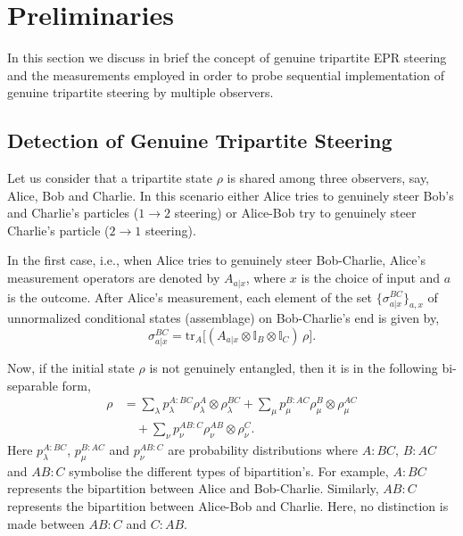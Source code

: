 \documentclass[pra,a4paper,aps,twocolumn,showpacs,superscriptaddress,groupedaddress]{revtex4}
\begin{document}
\section{Preliminaries} \label{s2}

In this section we discuss in brief the concept of genuine tripartite EPR steering and  the measurements employed in order to probe sequential implementation of genuine tripartite steering by multiple observers.

\subsection{Detection of Genuine Tripartite Steering}
 Let us consider that a tripartite state $\rho$ is shared among three observers, say, Alice, Bob and Charlie. In this scenario either Alice tries to genuinely steer Bob's and Charlie's particles ($1 \rightarrow 2$ steering) or Alice-Bob try to genuinely steer Charlie's particle ($2 \rightarrow 1$ steering).

In the first case, i.e., when Alice tries to genuinely steer Bob-Charlie,  Alice's measurement operators are denoted by $A_{a|x}$, where $x$ is the choice of input and $a$ is the outcome. After Alice's measurement, each element of the set $\{\sigma_{a|x}^{BC}\}_{a,x}$ of unnormalized conditional states (assemblage)  on Bob-Charlie's end is given by,
 \begin{equation}
	\sigma_{a|x}^{BC}= \text{tr}_A\big[(A_{a|x} \otimes \mathbb{I}_B \otimes \mathbb{I}_C) \, \rho \big].
\label{assemblage1}
\end{equation}  


Now, if the initial state $\rho$ is not genuinely entangled, then it is in the following bi-separable form,
\begin{align}
	\rho &= \sum_{\lambda}p_{\lambda}^{A:BC}\rho_{\lambda}^A \otimes \rho_{\lambda}^{BC} + \sum_{\mu}p_{\mu}^{B:AC}\rho_{\mu}^B \otimes \rho_{\mu}^{AC} \nonumber \\
	& \quad + \sum_{\nu}p_{\nu}^{AB:C}\rho_{\nu}^{AB} \otimes \rho_{\nu}^{C}.
	\label{biseparableform}
\end{align}
Here $p_{\lambda}^{A:BC}$, $p_{\mu}^{B:AC}$ and $p_{\nu}^{AB:C}$ are probability distributions where $A:BC$, $B:AC$ and $AB:C$ 
symbolise the different types of bipartition's. For example, $A:BC$ represents the bipartition between Alice and Bob-Charlie. Similarly, $AB:C$ represents the bipartition between Alice-Bob and Charlie. Here, no distinction is made between $AB:C$ and $C:AB$.
  
\end{document}
